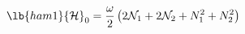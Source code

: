 \begin{equation}
\lb{ham1}
 {\cal H}_{0}=\frac{\omega}{2} 
\left(2 {\cal N}_{1}+ 2{\cal N}_{2 }+
N_{1}^{2}+N_{2}^{2} \right)
\end{equation}

